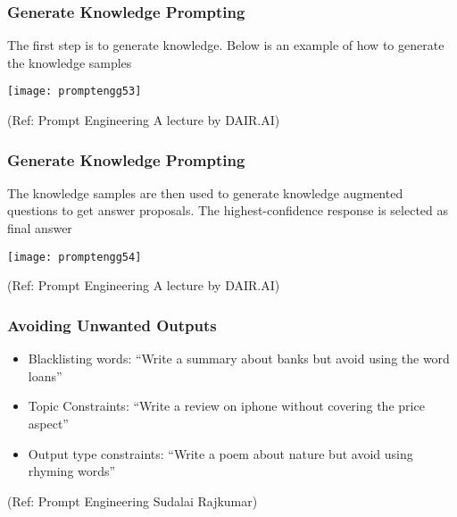 \begin{frame}[fragile]\frametitle{Generate Knowledge Prompting}

The first step is to generate knowledge. Below is an 
example of how to generate the knowledge samples

\begin{center}
\texttt{[image: promptengg53]}

{\tiny (Ref: Prompt Engineering A lecture by DAIR.AI)}

\end{center}	

\end{frame}

\begin{frame}[fragile]\frametitle{Generate Knowledge Prompting}

The knowledge samples are then used to generate 
knowledge augmented questions to get answer proposals. The highest-confidence response is selected as final answer

\begin{center}
\texttt{[image: promptengg54]}

{\tiny (Ref: Prompt Engineering A lecture by DAIR.AI)}

\end{center}	

\end{frame}


\begin{frame}[fragile]\frametitle{ Avoiding Unwanted Outputs}


\begin{itemize}
\item  Blacklisting words: ``Write a summary about banks but avoid using the word loans''
\item Topic Constraints: ``Write a review on iphone without covering the price aspect''
\item Output type constraints: ``Write a poem about nature but avoid using rhyming words''
\end{itemize}	 

		
		
{\tiny (Ref: Prompt Engineering Sudalai Rajkumar)}


\end{frame}

